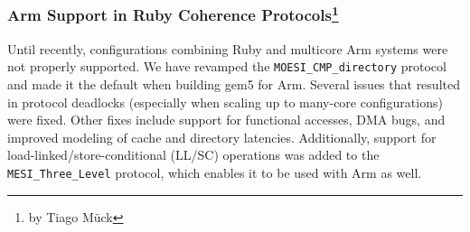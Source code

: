 

\subsubsection[Arm Support and Extensions]{Arm Support in Ruby Coherence Protocols\footnote{by Tiago M{\"u}ck}}

Until recently, configurations combining Ruby and multicore Arm systems were not properly supported.
We have revamped the \verb|MOESI_CMP_directory| protocol and made it the default when building gem5 for Arm.
Several issues that resulted in protocol deadlocks (especially when scaling up to many-core configurations) were fixed.
Other fixes include support for functional accesses, DMA bugs, and improved modeling of cache and directory latencies.
Additionally, support for load-linked/store-conditional (LL/SC) operations was added to the \verb|MESI_Three_Level| protocol, which enables it to be used with Arm as well.
